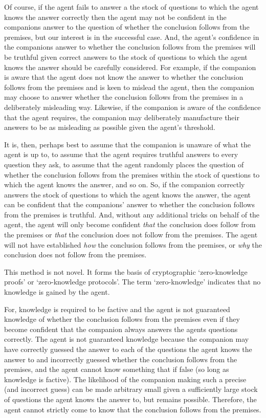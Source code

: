 \documentclass[10pt]{article}
\begin{document}
Of course, if the agent fails to answer a the stock of questions to which the agent knows the answer correctly then the agent may not be confident in the companions answer to the question of whether the conclusion follows from the premises, but our interest is in the successful case.
And, the agent's confidence in the companions answer to whether the conclusion follows from the premises will be truthful given correct answers to the stock of questions to which the agent knows the answer should be carefully considered.
For example, if the companion is aware that the agent does not know the answer to whether the conclusion follows from the premises and is keen to mislead the agent, then the companion may choose to answer whether the conclusion follows from the premises in a deliberately misleading way.
Likewise, if the companion is aware of the confidence that the agent requires, the companion may deliberately manufacture their answers to be as misleading as possible given the agent's threshold.

It is, then, perhaps best to assume that the companion is unaware of what the agent is up to, to assume that the agent requires truthful answers to every question they ask, to assume that the agent randomly places the question of whether the conclusion follows from the premises within the stock of questions to which the agent knows the answer, and so on.
So, if the companion correctly answers the stock of questions to which the agent knows the answer, the agent can be confident that the companions' answer to whether the conclusion follows from the premises is truthful.
And, without any additional tricks on behalf of the agent, the agent will only become confident \emph{that} the conclusion does follow from the premises or \emph{that} the conclusion does not follow from the premises.
The agent will not have established \emph{how} the conclusion follows from the premises, or \emph{why} the conclusion does not follow from the premises.

This method is not novel.
It forms the basis of cryptographic `zero-knowledge proofs' or `zero-knowledge protocols'.
The term `zero-knowledge' indicates that no knowledge is gained by the agent.

For, knowledge is required to be factive and the agent is not guaranteed knowledge of whether the conclusion follows from the premises even if they become confident that the companion always answers the agents questions correctly.
The agent is not guaranteed knowledge because the companion may have correctly guessed the answer to each of the questions the agent knows the answer to and incorrectly guessed whether the conclusion follows from the premises, and the agent cannot know something that if false (so long as knowledge is factive).
The likelihood of the companion making such a precise (and incorrect guess) can be made arbitrary small given a sufficiently large stock of questions the agent knows the answer to, but remains possible.
Therefore, the agent cannot strictly come to know that the conclusion follows from the premises.
\end{document}
